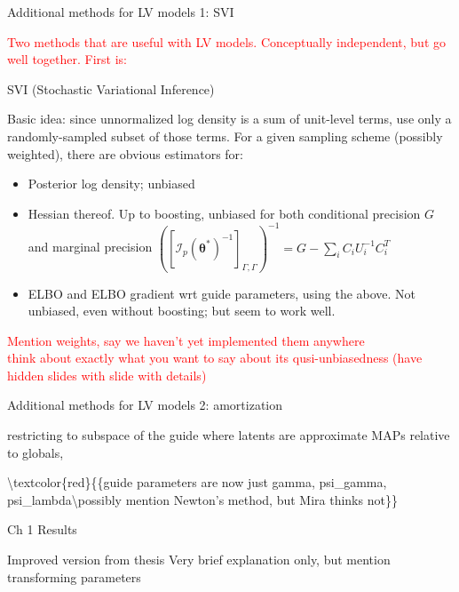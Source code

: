 \documentclass[
  ignorenonframetext,
]{beamer}
\providecommand{\tightlist}{%
  \setlength{\itemsep}{0pt}\setlength{\parskip}{0pt}}
\begin{document}
\begin{frame}{Additional methods for LV models 1: SVI}
\protect\hypertarget{additional-methods-for-lv-models-1-svi}{}

\textcolor{red}{{\scriptsize Two methods that are useful with LV models. Conceptually independent, but go well together. First is:}}

SVI (Stochastic Variational Inference)

Basic idea: since unnormalized log density is a sum of unit-level terms,
use only a randomly-sampled subset of those terms. For a given sampling
scheme (possibly weighted), there are obvious estimators for:

\begin{itemize}
\tightlist
\item
  Posterior log density; unbiased
\item
  Hessian thereof. Up to boosting, unbiased for both conditional
  precision \(G\) and marginal precision
  \(([\mathcal{I}_p(\bm{\theta}^*)^{-1}]_{\Gamma,\Gamma})^{-1}=G-\sum_i C_iU_i^{-1}C_i^T\)
\item
  ELBO and ELBO gradient wrt guide parameters, using the above. Not
  unbiased, even without boosting; but seem to work well.
\end{itemize}

\textcolor{red}{{\scriptsize Mention weights, say we haven’t yet implemented them anywhere\\think about exactly what you want to say about its qusi-unbiasedness (have hidden slides with slide with details)}}

\end{frame}

\begin{frame}{Additional methods for LV models 2: amortization}
\protect\hypertarget{additional-methods-for-lv-models-2-amortization}{}

restricting to subspace of the guide where latents are approximate MAPs
relative to globals,

\textbackslash{}textcolor\{red\}\{\{\scriptsize guide parameters are now
just gamma, psi\_gamma, psi\_lambda\textbackslash{}possibly mention
Newton's method, but Mira thinks not\}\}

\end{frame}

\begin{frame}{Ch 1 Results}
\protect\hypertarget{ch-1-results}{}

Improved version from thesis Very brief explanation only, but mention
transforming parameters

\end{frame}
\end{document}
